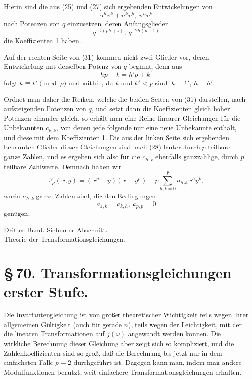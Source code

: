\documentclass[11pt]{article}
\begin{document}
Hierin sind die aus (25) und (27) sich ergebenden Entwickelungen von
\[
 u^hv^k+u^kv^h,\
 u^hv^h
\]
nach Potenzen von $q$ einzusetzen, deren Anfangsglieder
\[
 q^{-2(ph+k)},\
 q^{-2h(p+1)}
\]
die Koeffizienten 1 haben.

Auf der rechten Seite von (31) kommen nicht zwei Glieder vor, deren Entwickelung mit
derselben Potenz von $q$ beginnt, denn aus
\[
 hp+k=h'p+k'
\]
folgt $k\equiv k'\pmod p$ und mithin, da $k$ und $k'<p$ sind, $k=k'$, $h=h'$.

Ordnet man daher die Reihen, welche die beiden Seiten von (31) darstellen, nach
aufsteigenden Potenzen von $q$, und setzt dann die Koeffizienten gleich hoher Potenzen
einander gleich, so erhält man eine Reihe linearer Gleichungen für die Unbekannten
$c_{h,k}$, von denen jede folgende nur eine neue Unbekannte enthält, und diese mit dem
Koeffizienten 1. Die aus der linken Seite sich ergebenden bekannten Glieder dieser
Gleichungen sind nach (28) lauter durch $p$ teilbare ganze Zahlen, und es ergeben sich also
für die $c_{h,k}$ ebenfalls ganzzahlige, durch $p$ teilbare Zahlwerte. Demnach haben wir
\begin{equation}
 F_p(x,y)=(x^p-y)(x-y^p)-p\sum_{h,k=0}^{p}a_{h,k}x^hy^k,
\tag{32}
\end{equation}
worin $a_{h,k}$ ganze Zahlen sind, die den Bedingungen
\[
 a_{h,k}=a_{k,h},\
 a_{p,p}=0
\]
genügen.


\clearpage

\begin{center}
{\large Dritter Band. Siebenter Abschnitt.}\\[0.5em]
{\Large Theorie der Transformationsgleichungen.}
\end{center}

\section*{\S\,70. Transformationsgleichungen erster Stufe.}

Die Invariantengleichung ist von großer theoretischer Wichtigkeit teils wegen ihrer allgemeinen Gültigkeit (auch für gerade $n$), teils wegen der Leichtigkeit, mit der die linearen Transformationen auf $j(\omega)$ angewandt werden können. Die wirkliche Berechnung dieser Gleichung aber zeigt sich so kompliziert, und die Zahlenkoeffizienten sind so groß, daß die Berechnung bis jetzt nur in dem einfachsten Falle $p=2$ durchgeführt ist. Dagegen kann man, indem man andere Modulfunktionen benutzt, weit einfachere Transformationsgleichungen erhalten.
\end{document}

